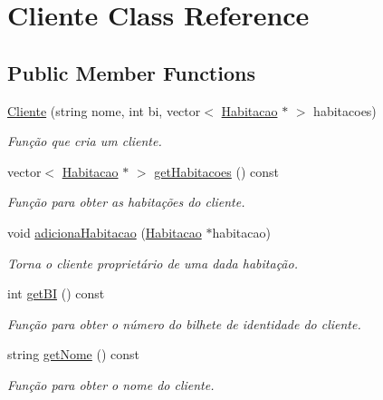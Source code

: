 \hypertarget{class_cliente}{}\section{Cliente Class Reference}
\label{class_cliente}
\subsection*{Public Member Functions}
\begin{DoxyCompactItemize}
\item 
\hyperlink{class_cliente_a2bccaf416e225c0f925e69ec132f415a}{Cliente} (string nome, int bi, vector$<$ \hyperlink{class_habitacao}{Habitacao} $\ast$ $>$ habitacoes)
\begin{DoxyCompactList}\small\item\em Função que cria um cliente. \end{DoxyCompactList}\item 
vector$<$ \hyperlink{class_habitacao}{Habitacao} $\ast$ $>$ \hyperlink{class_cliente_a6625c1bb73828bcaa067f41b7590408f}{get\+Habitacoes} () const 
\begin{DoxyCompactList}\small\item\em Função para obter as habitações do cliente. \end{DoxyCompactList}\item 
void \hyperlink{class_cliente_a7fafc50727fce6fef1d06e231ed87f3a}{adiciona\+Habitacao} (\hyperlink{class_habitacao}{Habitacao} $\ast$habitacao)
\begin{DoxyCompactList}\small\item\em Torna o cliente proprietário de uma dada habitação. \end{DoxyCompactList}\item 
int \hyperlink{class_cliente_a800f49dc0761b67a61e563ca9a1478a7}{get\+BI} () const 
\begin{DoxyCompactList}\small\item\em Função para obter o número do bilhete de identidade do cliente. \end{DoxyCompactList}\item 
string \hyperlink{class_cliente_a0325de899469e2fed48ffda2b5b291cf}{get\+Nome} () const 
\begin{DoxyCompactList}\small\item\em Função para obter o nome do cliente. \end{DoxyCompactList}\end{DoxyCompactItemize}


